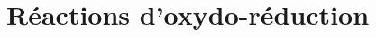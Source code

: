 \documentclass[../main/main.tex]{subfiles}
\begin{document}
\setcounter{chapter}{5}

\chapter{R\'eactions d'oxydo-r\'eduction}
\end{document}
